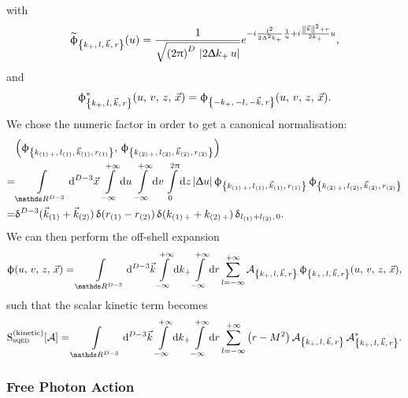 with
\begin{equation}
  \widetilde{\upphi}_{\qty{k_+,\, l,\, \vec{k},\, r}}(u)
  =
  \frac{1}{\sqrt{\qty( 2 \uppi )^D~ \abs{2 \Updelta k_+\, u}}}
  e^{
    - i \frac{l^2}{2 \Updelta^2 k_+} \frac{1}{u}
    + i \frac{\norm{\vec{k}}^2 + r}{2 k_+} u
  },
\end{equation}
and
\begin{equation}
  \upphi^*_{\qty{k_+,\, l,\, \vec{k},\, r}}\qty(u,\, v,\, z,\, \vec{x})
  =
  \upphi_{\qty{-k_+,\, -l,\, -\vec{k},\, r}}\qty(u,\, v,\, z,\, \vec{x}).
\end{equation}
We chose the numeric factor in order to get a canonical normalisation:
\begin{equation}
  \begin{split}
    &
    \qty( \phi_{\kmkrN{1}},\,  \phi_{\kmkrN{2}} )
    \\
    = &
    \int\limits_{\R^{D-3}} \dd[D-3]{\vec{x}}\,
    \infinfint{u}\,
    \infinfint{v}\,
    \finiteint{z}{0}{2\pi}
    \abs{\Delta u}\,
    \phi_{\kmkrN{1}}\, \phi_{\kmkrN{2}}
    \\
    = &
    \delta^{D-3}( \vec{k}_{\qty(1)} + \vec{k}_{\qty(2)})\,
    \delta( r_{\qty(1)} - r_{\qty(2)})\,
    \delta( k_{\qty(1)\, +} + k_{\qty(2)\, +})\,
    \delta_{l_{\qty(1)} + l_{\qty(2)},\, 0}.
  \end{split}
\end{equation} 
We can then perform the off-shell expansion
\begin{equation}
  \phi\qty(u,\, v,\, z,\, \vec{x})
  =
  \int\limits_{\R^{D-3}} \dd[D-3]{\vec{k}}
  \infinfint{k_+}
  \infinfint{r}
  \infinfsum{l}
  \cA_{\kmkr}\,
  \phi_{\kmkr}\qty(u,\, v,\, z,\, \vec{x}),
\end{equation}
such that the scalar kinetic term becomes 
\begin{equation}
  \rS_{\text{s}\qed}^{(\text{kinetic})}\qty[ \cA ]
  =
  \int\limits_{\R^{D-3}} \dd[D-3]{\vec{k}}\,
  \infinfint{k_+} 
  \infinfint{r}
  \infinfsum{l}
  \qty(r - M^2)\,
  \cA_{\kmkr}\,
  \cA_{\kmkr}^*.
\end{equation}


\subsubsection{Free Photon Action}

